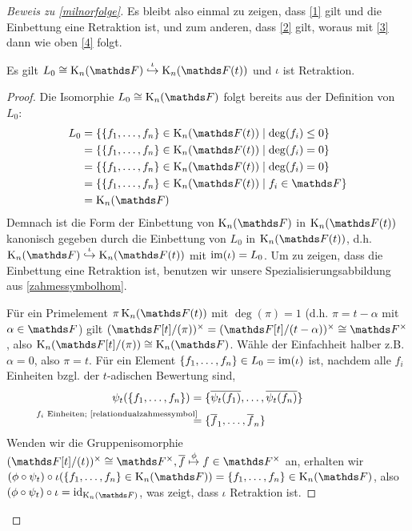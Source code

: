 \documentclass[ngerman,fontsize=11pt, paper=a4, parskip=half, titlepage=true, toc=bib]{scrartcl}
\begin{document}
\begin{proof}[Beweis zu \ref{milnorfolge}]
  Es bleibt also einmal zu zeigen, dass \ref{1} gilt und die Einbettung eine
  Retraktion ist, und zum anderen, dass \ref{2} gilt, woraus mit \ref{3} dann wie
  oben \ref{4} folgt.
  
  \begin{Lem}[\ref{1}]
    Es gilt $L_0\cong \KnF\overset{\iota}{\hookrightarrow} \KnFt$
    und $\iota$ ist Retraktion.
    \begin{proof}
      Die Isomorphie $L_0\cong\KnF$ folgt bereits aus der Definition
      von $L_0$:
      \begin{align*}
        L_0
        &=\left\{\{f_1,\dotsc,f_n\}\in\KnFt \mid \deg(f_i)\leq 0\right\}\\
        &=\left\{\{f_1,\dotsc,f_n\}\in\KnFt \mid \deg(f_i)= 0\right\}\\
        &=\left\{\{f_1,\dotsc,f_n\}\in\KnFt \mid \deg(f_i)= 0\right\}\\
        &=\left\{\{f_1,\dotsc,f_n\}\in\KnFt \mid f_i\in\F\right\}\\
        &=\KnF
      \end{align*}
      Demnach ist die Form der Einbettung von $\KnF$ in $\KnFt$
      kanonisch gegeben durch die Einbettung von $L_0$ in $\KnFt$, 
      d.h. $\KnF\overset{\iota}{\hookrightarrow}\KnFt$ mit $\operatorname{im}(\iota)=L_0$.
      Um zu zeigen, dass die Einbettung eine Retraktion ist,
      benutzen wir unsere Spezialisierungsabbildung aus 
      \ref{zahmessymbolhom}.
      
      Für ein Primelement $\pi\KnFt$ mit $\deg(\pi)=1$
      (d.h. $\pi=t-\alpha$ mit $\alpha\in\F$)
      gilt $(\Ftpi)^\times=(\F[t]/(t-\alpha))^\times\cong \Fx$, 
      also $\KnFtpi\cong\KnF$.
      Wähle der Einfachheit halber z.B. $\alpha=0$, also $\pi=t$.
      Für ein Element $\{f_1,\dotsc, f_n\}\in L_0=\operatorname{im}(\iota)$ ist,
      nachdem alle $f_i$ Einheiten bzgl. der $t$-adischen Bewertung sind,
      \begin{align*}
        \psi_t(\{f_1,\dotsc,f_n\})
        &=\{\ov{\psi_t(f_1)},\dotsc, \ov{\psi_t(f_n)}\}\\
        &\overset{\mathllap{\text{$f_i$ Einheiten; 
          \ref{relationdualzahmessymbol}}}}{=}
          \{\ov f_1,\dotsc, \ov f_n\}
      \end{align*}
      Wenden wir die Gruppenisomorphie $(\F[t]/(t))^\times\cong\Fx,
      \ov f\overset{\phi}{\mapsto} f\in\Fx$ an, erhalten wir
      $(\phi\circ\psi_t)\circ \iota(\{f_1,\dotsc,f_n\}\in\KnF)
      =\{f_1,\dotsc,f_n\}\in\KnF$,
      also $(\phi\circ\psi_t)\circ \iota=\id_{\KnF}$, was zeigt, dass
      $\iota$ Retraktion ist.
    \end{proof}
  \end{Lem}
  

\end{proof}
\end{document}
